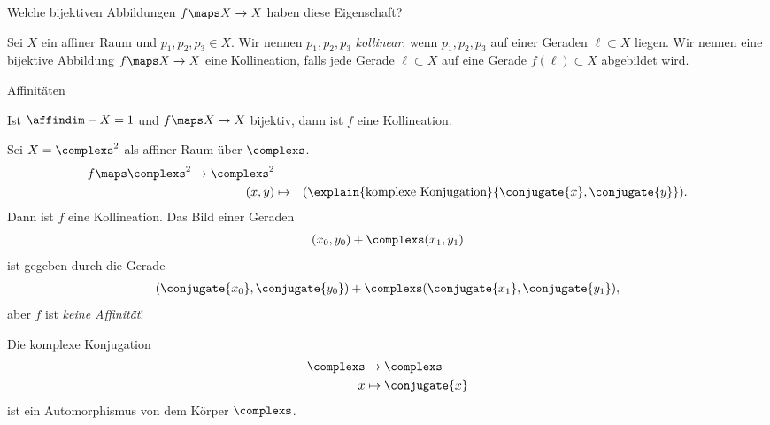 \begin{frage*}
    Welche bijektiven Abbildungen \( f\maps X\to X \) haben diese Eigenschaft?
\end{frage*}
\begin{definition*}
    Sei \( X \) ein affiner Raum und \( p_1,p_2,p_3\in X \). Wir nennen \( p_1,p_2,p_3 \) \emph{kollinear}, wenn \( p_1,p_2,p_3 \) auf einer Geraden \( \ell \subset X \) liegen. Wir nennen eine bijektive Abbildung \( f\maps X\to X \) eine Kollineation, falls jede Gerade \( \ell \subset X \) auf eine Gerade \( f(\ell)\subset X \) abgebildet wird.
\end{definition*}
\begin{beispiel}
    Affinitäten
\end{beispiel}
\begin{beispiel}
    Ist \( \affindim-{X}=1 \) und \( f\maps X\to X \) bijektiv, dann ist \( f \) eine Kollineation.
\end{beispiel}
\begin{beispiel}\label{kollinieationen:beispiele:komplexe_konjugation}
    Sei \( X=\complexs^2 \) als affiner Raum über \( \complexs \).
    \begin{align*}
        f\maps \begin{aligned}[t]
            \complexs^2\to \complexs^2\\
            (x,y)&\mapsto &(\explain{\text{komplexe Konjugation}}{\conjugate{x},\conjugate{y          }}).
        \end{aligned}
    \end{align*}
    Dann ist \( f \) eine Kollineation. Das Bild einer Geraden
    \begin{align*}
        (x_0,y_0)+\complexs(x_1,y_1)
    \end{align*}
    ist gegeben durch die Gerade
    \begin{align*}
        (\conjugate{x_0},\conjugate{y_0})+\complexs(\conjugate{x_1},\conjugate{y_1}),
    \end{align*}
    aber \( f \) ist \emph{keine Affinität}!
\end{beispiel}
\begin{bemerkung*}
    Die komplexe Konjugation
    \begin{align*}
        \begin{aligned}[t]
            \complexs&\to \complexs\\
            x&\mapsto \conjugate{x}
        \end{aligned}
    \end{align*}
    ist ein Automorphismus von dem Körper \( \complexs \).
\end{bemerkung*}